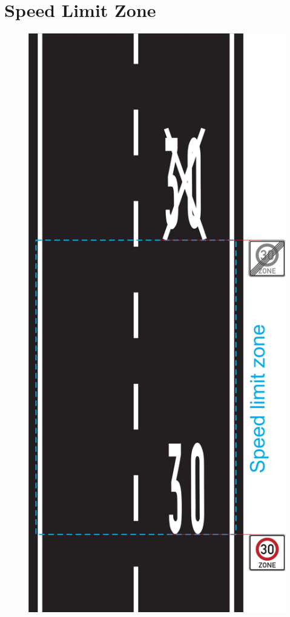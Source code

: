 \section{Speed Limit Zone}
\label{fig_speed_limit_zone}
\begin{figure}[H]
	\begin{center}
		\centering\includegraphics[]{graphics/Abb_7_speed_limit_zone.jpg}
	\end{center}
\end{figure}

